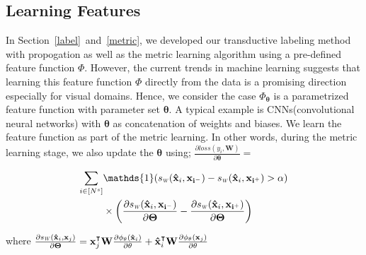 \subsection{Learning Features}
In Section~\ref{label}~and~\ref{metric}, we developed our transductive labeling method with propogation as well as the metric learning algorithm using a pre-defined feature function $\Phi$. However, the current trends in machine learning suggests that learning this feature function $\Phi$ directly from the data  is a promising direction especially for visual domains. Hence, we consider the case $\Phi_{\mathbf{\theta}}$ is a parametrized feature function with parameter set $\mathbf{\theta}$. A typical example is CNNs(convolutional neural networks) with $\mathbf{\theta}$ as concatenation of weights and biases. We learn the feature function as part of the metric learning. In other words, during the metric learning stage, we also update the $\mathbf{\theta}$ using; $\frac{\partial loss (y_i, \mathbf{W})}{\partial \mathbf{\theta}} =$

\begin{small}
\begin{equation}
\begin{aligned}
 \sum_{i \in [N^s]} &\mathds{1}(\sw(\xsi,\mathbf{x_{i^-}}) - \sw(\xsi,\mathbf{x_{i^+}})>\alpha)  \\
 &\times \left(\frac{\partial \sw(\xsi,\mathbf{x_{i^-}}) }{\partial \mathbf{\Theta}} - \frac{\partial \sw(\xsi,\mathbf{x_{i^+}}) }{\partial \mathbf{\Theta}} \right)
 \label{gradt}
 \end{aligned}
\end{equation}
\end{small}
where $\frac{\partial \sw(\xsi,\xuj) }{\partial \mathbf{\Theta}} =\xuj^\intercal \mathbf{W} \frac{\partial \phi_\mathbf{\theta}(\xsi)}{\partial \theta} + \xsi^\intercal \mathbf{W} \frac{\partial \phi_\mathbf{\theta}(\xuj)}{\partial \theta} $

